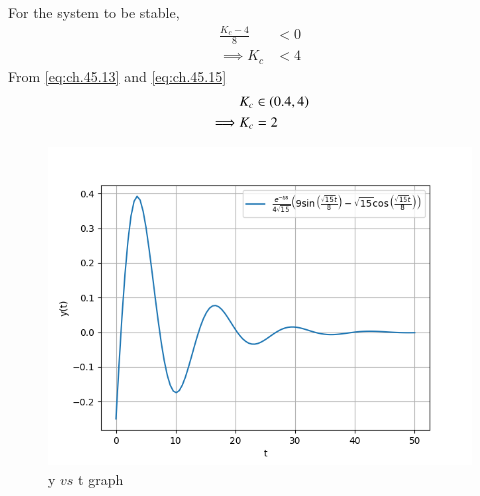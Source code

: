 \documentclass[journal,12pt,twocolumn]{IEEEtran}
\theoremstyle{remark}
\begin{document}
For the system to be stable,
\begin{align}
    \frac{K_c-4}{8}&<0   \\
    \implies K_c&<4 \label{eq:ch.45.15}
\end{align}
From \eqref{eq:ch.45.13} and \eqref{eq:ch.45.15}
\begin{align}
    &K_c \in \left(0.4,4\right)    \\
    \implies &K_c=2
\end{align}
\begin{figure}[htbp]
    \centering
    \includegraphics[width=\columnwidth]{figs/b.png}
    \caption{y $vs$ t graph}
    \label{fig:ch.45.2}
\end{figure}     
\end{document}
